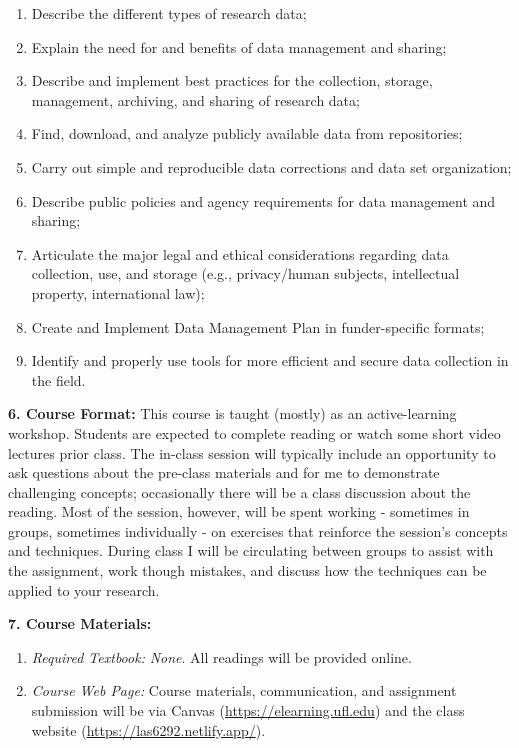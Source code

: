 \documentclass[
  12pt,
]{article}
\providecommand{\tightlist}{%
  \setlength{\itemsep}{0pt}\setlength{\parskip}{0pt}}
\begin{document}
\begin{enumerate}
\def\labelenumi{\arabic{enumi}.}
\tightlist
\item
  Describe the different types of research data;
\item
  Explain the need for and benefits of data management and sharing;
\item
  Describe and implement best practices for the collection, storage,
  management, archiving, and sharing of research data;
\item
  Find, download, and analyze publicly available data from repositories;
\item
  Carry out simple and reproducible data corrections and data set
  organization;
\item
  Describe public policies and agency requirements for data management
  and sharing;
\item
  Articulate the major legal and ethical considerations regarding data
  collection, use, and storage (e.g., privacy/human subjects,
  intellectual property, international law);
\item
  Create and Implement Data Management Plan in funder-specific formats;
\item
  Identify and properly use tools for more efficient and secure data
  collection in the field.
\end{enumerate}

\textbf{6. Course Format:} This course is taught (mostly) as an
active-learning workshop. Students are expected to complete reading or
watch some short video lectures prior class. The in-class session will
typically include an opportunity to ask questions about the pre-class
materials and for me to demonstrate challenging concepts; occasionally
there will be a class discussion about the reading. Most of the session,
however, will be spent working - sometimes in groups, sometimes
individually - on exercises that reinforce the session's concepts and
techniques. During class I will be circulating between groups to assist
with the assignment, work though mistakes, and discuss how the
techniques can be applied to your research.

\textbf{7. Course Materials:}

\begin{enumerate}
\def\labelenumi{\arabic{enumi}.}
\item
  \emph{Required Textbook:} \emph{None}. All readings will be provided
  online.
\item
  \emph{Course Web Page:} Course materials, communication, and
  assignment submission will be via Canvas
  (\url{https://elearning.ufl.edu}) and the class website
  (\url{https://las6292.netlify.app/}).
\end{enumerate}
\end{document}
